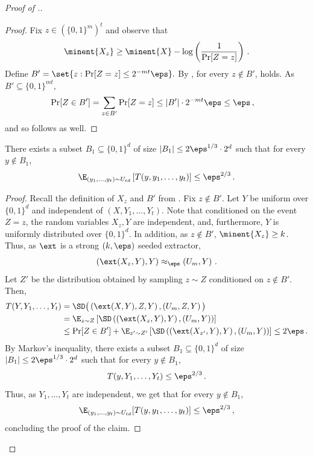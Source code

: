 \begin{proof}[Proof of .]
\begin{proof}
%
	
	Fix $z\in (\{0,1\}^m)^t$ and observe that  
	\begin{equation}\label{eq: condition min entropy loss delta}
		\minent{ X_{z}} \geq \minent{X} - \log\left(\frac{1}{\Pr[Z = z]}\right)\,.
	\end{equation}
	Define
	$
	B' = \set{z : \Pr[Z = z] \le 2^{-mt}  \eps}.
	$
	By , for every $z \notin B'$,  holds.
 	As $B' \subseteq \{0,1\}^{mt}$,
\begin{align*}
	\Pr[Z\in B'] &= \sum_{z \in B'}\Pr[Z = z] 
	\leq |B'| \cdot 2^{-mt}  \eps \le \eps\,,
\end{align*}
and so  follows as well.
\end{proof}

\begin{claim}\label{claim:average behavior}
There exists a subset $B_1 \subseteq \{0,1\}^d$ of size $|B_1| \le 2\eps^{1/3} \cdot 2^d$ such that for every $y \notin B_1$,
\[
\E_{(y_1,\ldots,y_t) \sim U_{td}}\left[T(y,y_1,\ldots,y_t)\right] \le \eps^{2/3}\,.
\]
\end{claim}

\begin{proof}
Recall the definition of $X_{z}$ and $B'$ from . 
Fix $z \not\in B'$. Let $Y$ be uniform over $\{0,1\}^d$ and independent of $(X,Y_1,\ldots, Y_t)$. Note that conditioned on the event $Z = z$, the random variables $X_{z}, Y$ are independent, and, furthermore, $Y$ is uniformly distributed over $\{0,1\}^d$. In addition, as $z \not\in B'$, $\minent{X_{z}} \ge k$. Thus, as $\ext$ is a strong $(k,\eps)$ seeded extractor,
\[
\left( \ext(X_{z},Y), Y \right) \approx_\eps \left( U_m, Y \right)\,.
\]
Let $Z'$ be the distribution obtained by sampling $z \sim Z$ conditioned on $z \notin B'$. Then,
\begin{align*}
T(Y,Y_1,\ldots,Y_t) &= \SD\big( \left(\ext(X,Y), Z , Y \right),  \left(U_m, Z, Y\right) \big) \\
&= \E_{z \sim Z} \left[ \SD\left( \left(\ext(X_{z},Y), Y \right),
          \left(U_m, Y \right)
   \right) \right] \\
&\le \Pr[Z \in B'] + \E_{z' \sim Z'}\left[ \SD\left( \left(\ext(X_{z'},Y), Y \right),
          \left(U_m, Y \right)
   \right) \right] \le 2\eps\,.
\end{align*}
By Markov's inequality, there exists a subset $B_1 \subseteq \{0,1\}^d$ of size $|B_1| \le 2\eps^{1/3} \cdot 2^d$ such that for every $y \notin B_1$,
\[
T(y,Y_1,\ldots,Y_t) \leq \eps^{2/3}\,.
\]
Thus, as $Y_1,\ldots, Y_t$ are independent, we get that for every $y \notin B_1$,
\[
\E_{(y_1,\ldots,y_t) \sim U_{td}}[T(y,y_1,\ldots,y_t)] \le \eps^{2/3}\,,
\]
concluding the proof of the claim.
\end{proof}


\end{proof}
